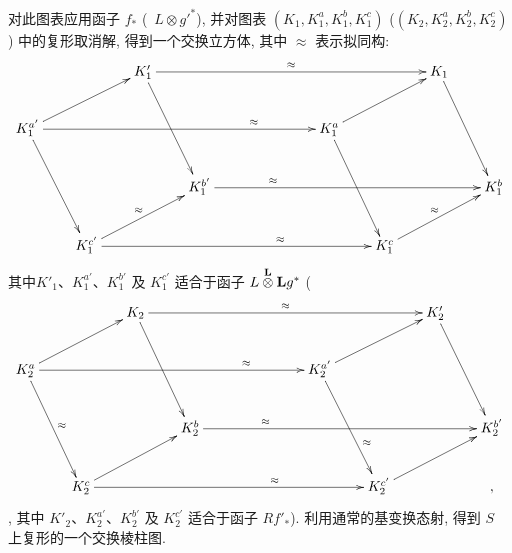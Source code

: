 对此图表应用函子 $f_{\ast}$ (\resp~$L\otimes {g'}^{\ast}$), 并对图表 $(K_{1},K^{a}_{1},K^{b}_{1}, K^{c}_{1})$ (\resp $(K_{2}, K^{a}_{2},
K^{b}_{2}, K^{c}_{2})$) 中的复形取消解, 得到一个交换立方体, 其中 $\approx$ 表示拟同构:
\[
\xymatrix@C=2em{
          &         &K'_1 \ar[rdd] \ar[rrrrrr]^{\approx}&        && &         &
          & K_1\ar[rdd]\\  K_1^{a'}\ar[rru]\ar[rdd]\ar[rrrrrr]^(.75){\approx} &         &      &        && & K_1^{a}\ar[rru] \ar[rdd]&       &\\
  &         &      &K^{b'}_1 \ar[rrrrrr] ^(.25){\approx}&& &         &         &   & K^{b}_1\\
          &K_1^{c'} \ar[rru]^{\approx}\ar[rrrrrr] ^(.65){\approx}&      &        && &         &K_1^{c}\ar[rru]^{\approx} \\
}
\]
其中\pageoriginale $K'_{1}$、$K^{a'}_{1}$、$K^{b'}_{1}$ 及 $K^{c'}_{1}$ 适合于函子 $L\overset{\mathbf{L}}{\otimes}\mathbf{L} g^{\ast}$ (\resp \[
\xymatrix@C=2em{
        &         &K_2 \ar[rdd] \ar[rrrrrr]^{\approx}&        && &         &
          & K'_2\ar[rdd]\\
K_2^{a}\ar[rru]\ar[rdd]^{\approx}\ar[rrrrrr]^(.75){\approx} &         &      &        && & K_2^{a'}\ar[rru] \ar[rdd]^(.65){\approx}&       &\\
  &         &      &K^{b}_2 \ar[rrrrrr] ^(.25){\approx}&& &         &         &   & K^{b'}_2\\
          &K_2^{c} \ar[rru]\ar[rrrrrr] ^(.65){\approx}&      &
        && &         &K_2^{c'}\ar[rru] & &, \\
}
\], 其中 $K'_{2}$、$K^{a'}_{2}$、$K^{b'}_{2}$ 及 $K^{c'}_{2}$ 适合于函子 $Rf'_{\ast}$). 利用通常的基变换态射, 得到 $S$ 上复形的一个交换棱柱图.
\newcommand{\circlenum}[1]{\bigcirc \kern -.255cm \lower
  .05em\hbox{${#1}$}}

